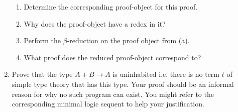 \documentclass[11pt]{report}
\begin{document}
\begin{enumerate}
	  	\begin{enumerate}
			\item Determine the corresponding proof-object for this proof. 
			\item Why does the proof-object have a redex in it? 
			\item Perform the $\beta$-reduction on the proof object from (a).
			\item What proof does the reduced proof-object correspond to?
		\end{enumerate} 

	\item Prove that the type $A + B \to A$ is uninhabited i.e. there is no term $t$ of simple type theory that has this type. Your proof should be an informal reason for why no such program can exist. You might refer to the corresponding minimal logic sequent to help your justification.	

	 
\end{enumerate}
	
\end{document}
